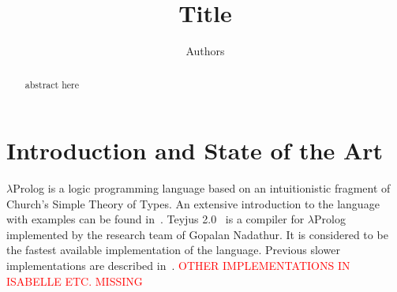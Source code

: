 \documentclass{llncs}
\begin{document}
\title{Title }





\author{Authors}






\newcommand{\frag}{Reduction Free Fragment}
\newcommand{\lp}{$\lambda$Prolog}
\newcommand{\elpi}{ELPI}
\newcommand{\CSC}[1]{\textcolor{red}{#1}}

\maketitle

\begin{abstract}
abstract here
\end{abstract}


\section{Introduction and State of the Art}
\lp{} is a logic programming language based on an intuitionistic fragment
of Church's Simple Theory of Types. An extensive introduction to the language
with examples can be found in~\cite{dalebook}. Teyjus 2.0~\cite{teyjus} is a compiler for \lp{} implemented by the research team of Gopalan Nadathur. It is considered to be the fastest available implementation of the language. Previous slower implementations are described in~\cite{}. \CSC{OTHER IMPLEMENTATIONS IN ISABELLE ETC. MISSING}
\end{document}
